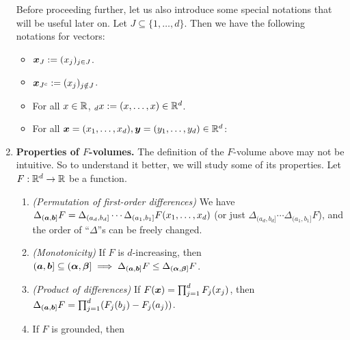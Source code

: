 \begin{enumerate}
Before proceeding further, let us also introduce some special notations that
will be useful later on. Let \(J\subseteq \{1,\dotsc,d\}\). Then we have the
following notations for vectors:
\begin{itemize}
\item \(\bm{x}_{J}:=(x_{j})_{j\in J}\).
\item \(\bm{x}_{J^c}:=(x_j)_{j\notin J}\).
\item For all \(x\in\mathbb{R}\), \({}_{d}x:=(x,\dotsc,x)\in\mathbb{R}^d\).
\item For all \(\bm{x}=(x_1,\dotsc,x_d),\bm{y}=(y_1,\dotsc,y_d)\in\mathbb{R}^d\):
\end{itemize}
\item\label{it:f-vol-prop} \textbf{Properties of \(F\)-volumes.} The definition of the \(F\)-volume
above may not be intuitive. So to understand it better, we will study some of
its properties. Let \(F:\mathbb{R}^d\to\mathbb{R}\) be a function.
\begin{enumerate}
\item\label{it:f-vol-permut} \emph{(Permutation of first-order differences)} We
have \(\Delta_{(\bm{a},\bm{b}]}F
=\Delta_{(a_d,b_d]}\dotsb\Delta_{(a_1,b_1]}F(x_1,\dotsc,x_d)\) (or just
\(\Delta_{(a_d,b_d]}\dotsb\Delta_{(a_1,b_1]}F\)), and the order of
``\(\Delta\)''s can be freely changed.
\item\label{it:f-vol-mono} \emph{(Monotonicity)} If \(F\) is \(d\)-increasing, then
\((\bm{a},\bm{b}]\subseteq (\bm{\alpha},\bm{\beta}]\implies \Delta_{(\bm{a},\bm{b}]}F
\le\Delta_{(\bm{\alpha},\bm{\beta}]}F\).
\item\label{it:f-vol-prod-diff} \emph{(Product of differences)} If \(F(\bm{x})=\prod_{j=1}^{d}F_j(x_j)\), then
\(\Delta_{(\bm{a},\bm{b}]}F=\prod_{j=1}^{d}(F_{j}(b_j)-F_{j}(a_j))\).
\item\label{it:ground-lim} If \(F\) is grounded, then

\end{enumerate}
\end{enumerate}
